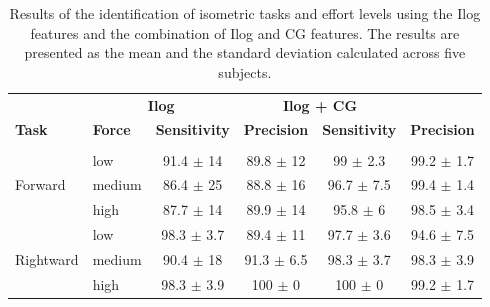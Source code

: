 \begin{table}[]
\centering
\caption{Results of the identification of isometric tasks and effort levels using the Ilog features and the combination of Ilog and CG features. The results are presented as the mean and the standard deviation calculated across five subjects.}
\label{tb:4-2}
\begin{tabular}{llcccc}
              & \multicolumn{2}{c}{\textbf{Ilog}}                            & \multicolumn{2}{c}{\textbf{Ilog + CG}}                       \\
\textbf{Task} & \textbf{Force} & \textbf{Sensitivity}                          & \textbf{Precision}                           & \textbf{Sensitivity}                         & \textbf{Precision}                          \\ \hline
              &                &                                               &                                              &                                             &                                             \\
              & low            & 91.4 $\pm$ 14                                 & 89.8 $\pm$ 12                                & 99 $\pm$ 2.3                                & 99.2 $\pm$ 1.7                              \\
Forward       & medium         & 86.4 $\pm$ 25                                 & 88.8 $\pm$ 16                                & 96.7 $\pm$ 7.5                              & 99.4 $\pm$ 1.4                              \\
              & high           & 87.7 $\pm$ 14                                 & 89.9 $\pm$ 14                                & 95.8 $\pm$ 6                                & 98.5 $\pm$ 3.4                              \\ \hline
              & low            & 98.3 $\pm$ 3.7                                & 89.4 $\pm$ 11                                & 97.7 $\pm$ 3.6                              & 94.6 $\pm$ 7.5                              \\
Rightward     & medium         & 90.4 $\pm$ 18                                 & 91.3 $\pm$ 6.5                               & 98.3 $\pm$ 3.7                              & 98.3 $\pm$ 3.9                              \\
              & high           & 98.3 $\pm$ 3.9                                & 100 $\pm$ 0                                  & 100 $\pm$ 0                                 & 99.2 $\pm$ 1.7                              \\ \hline

\end{tabular}
\end{table}
